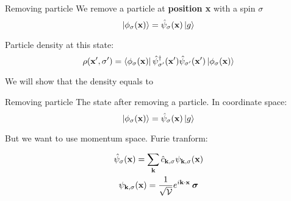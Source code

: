 
\begin{frame}{Removing particle}
  We remove a particle at \textbf{position x} with a spin $\sigma$
  \begin{equation*}
    \ket{\phi_\sigma(\textbf{x})} = \hat{\psi}_\sigma(\textbf{x})\ket{g}
  \end{equation*}

  \vspace{0.5cm}
  Particle density at this state:
  \begin{equation*}
    \rho(\textbf{x}', \sigma') = \bra{\phi_\sigma(\textbf{x})}\hat{\psi}_{\sigma'}^\dagger(\textbf{x}')\hat{\psi}_{\sigma'}(\textbf{x}')\ket{\phi_\sigma(\textbf{x})}
  \end{equation*}

  \vspace{0.5cm}
  We will show that the density equals to

\end{frame}

\begin{frame}{Removing particle}
  The state after removing a particle. In coordinate space:
  \begin{equation*}
    \ket{\phi_\sigma(\textbf{x})} = \hat{\psi}_\sigma(\textbf{x})\ket{g}
  \end{equation*}

  But we want to use momentum space. Furie tranform:

  \begin{equation*}
    \begin{gathered}
      \hat{\psi}_\sigma(\textbf{x}) = \sum_{\textbf{k}} \hat{c}_{\textbf{k},\sigma} \psi_{\textbf{k},\sigma}(\textbf{x})\\
      \psi_{\textbf{k},\sigma}(\textbf{x}) = \frac{1}{\sqrt{\mathcal{V}}} e^{i\textbf{k} \cdot \textbf{x}} \: \boldsymbol{\sigma}
    \end{gathered}
  \end{equation*}

\end{frame}
